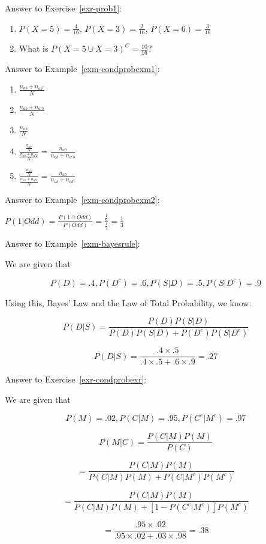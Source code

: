 \documentclass[
  letterpaper,
]{book}
\theoremstyle{definition}
\theoremstyle{definition}
\theoremstyle{plain}
\theoremstyle{definition}
\theoremstyle{plain}
\theoremstyle{plain}
\theoremstyle{remark}
\begin{document}
Answer to Exercise~\ref{exr-prob1}:

\begin{enumerate}
\def\labelenumi{\arabic{enumi}.}
\item
  \(P(X = 5) = \frac{4}{16}\), \(P(X = 3) = \frac{2}{16}\),
  \(P(X = 6) = \frac{3}{16}\)
\item
  What is \(P(X=5 \cup X = 3)^C = \frac{10}{16}\)?
\end{enumerate}

Answer to Example~\ref{exm-condprobexm1}:

\begin{enumerate}
\def\labelenumi{\arabic{enumi}.}
\item
  \(\frac{n_{ab} + n_{ab^c}}{N}\)
\item
  \(\frac{n_{ab} + n_{a^cb}}{N}\)
\item
  \(\frac{n_{ab}}{N}\)
\item
  \(\frac{\frac{n_{ab}}{N}}{\frac{n_{ab} + n_{a^cb}}{N}} = \frac{n_{ab}}{n_{ab} + n_{a^cb}}\)
\item
  \(\frac{\frac{n_{ab}}{N}}{\frac{n_{ab} + n_{ab^c}}{N}} = \frac{n_{ab}}{n_{ab} + n_{ab^c}}\)
\end{enumerate}

Answer to Example~\ref{exm-condprobexm2}:

\(P(1|Odd) = \frac{P(1 \cap Odd)}{P(Odd)} = \frac{\frac{1}{6}}{\frac{1}{2}} = \frac{1}{3}\)

Answer to Example~\ref{exm-bayesrule}:

We are given that

\[P(D) = .4, P(D^c) = .6, P(S|D) = .5, P(S|D^c) = .9\]

Using this, Bayes' Law and the Law of Total Probability, we know:

\[P(D|S) = \frac{P(D)P(S|D)}{P(D)P(S|D) + P(D^c)P(S|D^c)}\]

\[P(D|S) = \frac{.4 \times .5}{.4 \times .5 + .6 \times .9 } = .27\]

Answer to Exercise~\ref{exr-condprobexr}:

We are given that

\[P(M) = .02, P(C|M) = .95, P(C^c|M^c) = .97\]

\[P(M|C) = \frac{P(C|M)P(M)}{P(C)}\]

\[= \frac{P(C|M)P(M)}{P(C|M)P(M) + P(C|M^c)P(M^c)}\]

\[= \frac{P(C|M)P(M)}{P(C|M)P(M) + [1-P(C^c|M^c)]P(M^c)}\]

\[ = \frac{.95 \times .02}{.95 \times .02 + .03 \times .98} = .38\]
\end{document}
